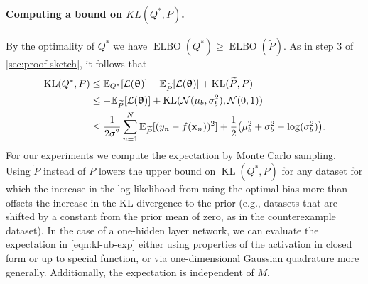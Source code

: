 \documentclass[twoside]{article}
\newcommand{\vx}{\mathbf{x}}
\newcommand{\vtheta}{\bm{\uptheta}}
\newcommand{\E}{\mathbb{E}}
\newcommand{\KL}{\operatorname{KL}}
\DeclarePairedDelimiter\parens{(}{)}             %
\theoremstyle{theoremstyle}
\begin{document}
\paragraph{Computing a bound on $KL(Q^*,P)$.}
By the optimality of $Q^*$ we have $\operatorname{ELBO}(Q^*) \ge \operatorname{ELBO}(\widetilde{P})$. As in step 3 of \cref{sec:proof-sketch}, it follows that
\begin{align}
    \KL(Q^*, P) &\le \E_{Q^*}[\mathcal{L}(\vtheta)] - \E_{\widetilde{P}}[\mathcal{L}(\vtheta)] + \KL(\widetilde{P}, P)
    \\
    &\le -\E_{\widetilde{P}}[\mathcal{L}(\vtheta)] + \KL(\mathcal{N}(\mu_b,\sigma^2_b), \mathcal{N}(0,1))
    \\
    &\le \frac{1}{2\sigma^2}\sum_{n=1}^N \E_{\widetilde{P}}[(y_n - f(\vx_n))^2] + \frac{1}{2}\parens*{\mu_b^2 + \sigma_b^2 - \log(\sigma_b^2)}. \label{eqn:kl-ub-exp}
\end{align}
For our experiments we compute the expectation by Monte Carlo sampling. Using $\widetilde{P}$ instead of $P$ lowers the upper bound on $\KL(Q^*, P)$ for any dataset for which the increase in the log likelihood from using the optimal bias more than offsets the increase in the KL divergence to the prior (e.g., datasets that are shifted by a constant from the prior mean of zero, as in the counterexample dataset). In the case of a one-hidden layer network, we can evaluate the expectation in \cref{eqn:kl-ub-exp} either using properties of the activation in closed form or up to special function, or via one-dimensional Gaussian quadrature more generally. Additionally, the expectation is independent of $M$.
\end{document}
